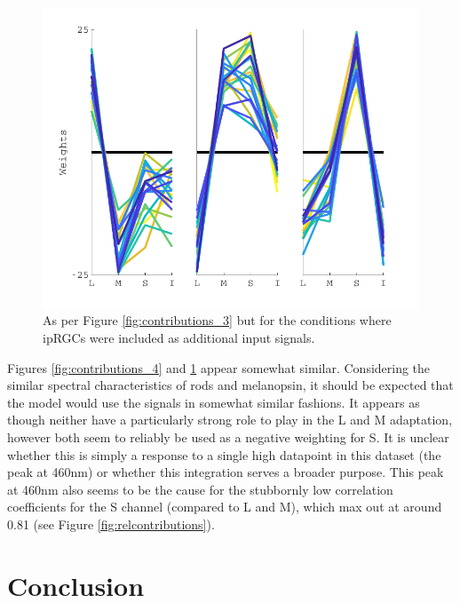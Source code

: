 \begin{figure}[htbp]
\includegraphics[max width=\textwidth]{figs/LargeSphere/contributions_5minusrods.pdf}
\caption{As per Figure \ref{fig:contributions_3} but for the conditions where ipRGCs were included as additional input signals.} 
\label{fig:contributions_5minusrods}
\end{figure}

Figures \ref{fig:contributions_4} and \ref{fig:contributions_5minusrods} appear somewhat similar. Considering the similar spectral characteristics of rods and melanopsin, it should be expected that the model would use the signals in somewhat similar fashions. It appears as though neither have a particularly strong role to play in the L and M adaptation, however both seem to reliably be used as a negative weighting for S. It is unclear whether this is simply a response to a single high datapoint in this dataset (the peak at 460nm) or whether this integration serves a broader purpose. This peak at 460nm also seems to be the cause for the stubbornly low correlation coefficients for the S channel (compared to L and M), which max out at around 0.81 (see Figure \ref{fig:relcontributions}). 

\section{Conclusion}












